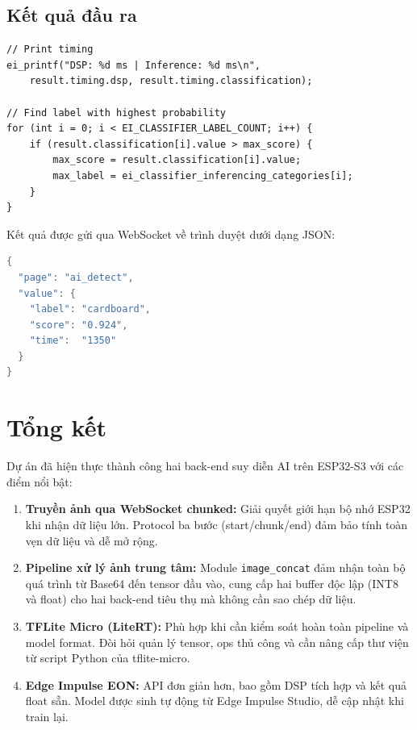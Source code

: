 \documentclass[12pt,a4paper]{article}
\begin{document}
\subsection{Kết quả đầu ra}

\begin{lstlisting}[caption={Đọc kết quả từ \texttt{ei\_impulse\_result\_t}}]
// Print timing
ei_printf("DSP: %d ms | Inference: %d ms\n",
    result.timing.dsp, result.timing.classification);

// Find label with highest probability
for (int i = 0; i < EI_CLASSIFIER_LABEL_COUNT; i++) {
    if (result.classification[i].value > max_score) {
        max_score = result.classification[i].value;
        max_label = ei_classifier_inferencing_categories[i];
    }
}
\end{lstlisting}

Kết quả được gửi qua WebSocket về trình duyệt dưới dạng JSON:
\begin{lstlisting}[language=Java, caption={JSON kết quả trả về trình duyệt}]
{
  "page": "ai_detect",
  "value": {
    "label": "cardboard",
    "score": "0.924",
    "time":  "1350"
  }
}
\end{lstlisting}

\section{Tổng kết}

Dự án đã hiện thực thành công hai back-end suy diễn AI trên ESP32-S3 với các điểm nổi bật:

\begin{enumerate}
  \item \textbf{Truyền ảnh qua WebSocket chunked:} Giải quyết giới hạn bộ nhớ ESP32 khi nhận dữ liệu lớn. Protocol ba bước (start/chunk/end) đảm bảo tính toàn vẹn dữ liệu và dễ mở rộng.

  \item \textbf{Pipeline xử lý ảnh trung tâm:} Module \texttt{image\_concat} đảm nhận toàn bộ quá trình từ Base64 đến tensor đầu vào, cung cấp hai buffer độc lập (INT8 và float) cho hai back-end tiêu thụ mà không cần sao chép dữ liệu.

  \item \textbf{TFLite Micro (LiteRT):} Phù hợp khi cần kiểm soát hoàn toàn pipeline và model format. Đòi hỏi quản lý tensor, ops thủ công và cần nâng cấp thư viện từ script Python của tflite-micro.

  \item \textbf{Edge Impulse EON:} API đơn giản hơn, bao gồm DSP tích hợp và kết quả float sẵn. Model được sinh tự động từ Edge Impulse Studio, dễ cập nhật khi train lại.
\end{enumerate}
\end{document}

